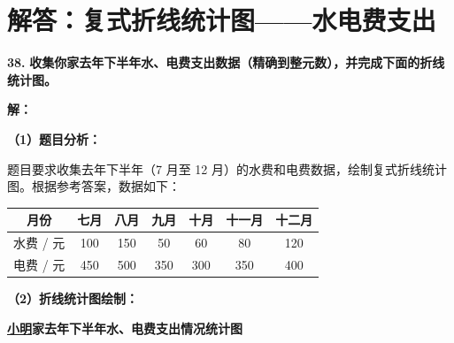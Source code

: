 \newpage



\section{解答：复式折线统计图——水电费支出}

\vspace{0.6cm}

\textbf{\LARGE 38.} \textbf{收集你家去年下半年水、电费支出数据（精确到整元数），并完成下面的折线统计图。}

\vspace{0.4cm}
\textbf{解：}

\textbf{（1）题目分析：}

题目要求收集去年下半年（7 月至 12 月）的水费和电费数据，绘制复式折线统计图。根据参考答案，数据如下：

\vspace{0.2cm}
\begin{center}
\renewcommand{\arraystretch}{1.5}
\begin{tabular}{c|c|c|c|c|c|c}
\toprule[1.2pt]
月份 & 七月 & 八月 & 九月 & 十月 & 十一月 & 十二月 \\
\hline
水费 / 元 & 100 & 150 & 50 & 60 & 80 & 120 \\
\hline
电费 / 元 & 450 & 500 & 350 & 300 & 350 & 400 \\
\bottomrule[1.2pt]
\end{tabular}
\end{center}

\vspace{0.4cm}
\textbf{（2）折线统计图绘制：}

\begin{center}
{\textbf{\large \underline{小明}家去年下半年水、电费支出情况统计图}}
\end{center}


